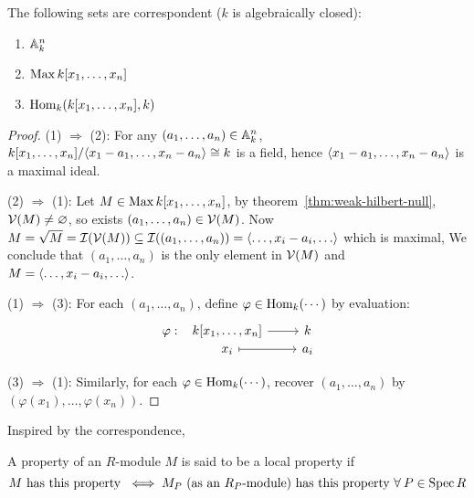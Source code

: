 \begin{prop}
  The following sets are correspondent ($k$ is algebraically closed):
  \begin{enumerate}[(1)]
    \item $\mathbb{A}_k^n$
    \item $\operatorname{Max} k[x_1, \dots, x_n]$
    \item $\operatorname{Hom}_k(k[x_1, \dots, x_n], k)$
  \end{enumerate}
  \begin{proof}
    (1) $\Rightarrow$ (2): For any $(a_1, \dots, a_n) \in \mathbb{A}_k^n$,
    $k[x_1, \dots, x_n] / \langle x_1 - a_1, \dots, x_n - a_n\rangle \cong k$ is a field,
    hence $\langle x_1 - a_1, \dots, x_n - a_n\rangle$ is a maximal ideal.

    (2) $\Rightarrow$ (1): Let $M \in \operatorname{Max} k[x_1, \dots, x_n]$,
    by theorem~\ref{thm:weak-hilbert-null}, $\mathcal{V}(M) \neq \varnothing$,
    so exists $(a_1, \dots, a_n) \in \mathcal{V}(M)$.
    Now $M = \sqrt{M} = \Ic(\Vc(M)) \subseteq \Ic((a_1, \dots, a_n)) = \gen{\dots, x_i - a_i, \dots}$
    which is maximal,
    We conclude that $(a_1, \dots, a_n)$ is the only element in $\mathcal{V}(M)$
    and $M = \gen{\dots, x_i - a_i, \dots}$.

    (1) $\Rightarrow$ (3): For each $(a_1, \dots, a_n)$, define $\varphi \in \operatorname{Hom}_k(\dotsm)$ by
    evaluation:
    \[
      \begin{tikzcd}[column sep=0.8cm,row sep=0ex]
        \varphi: &[-0.7cm] k[x_1, \dots, x_n] \arrow[r] & k \\
        & x_i \arrow[r, mapsto] & a_i
      \end{tikzcd}
    \]

    (3) $\Rightarrow$ (1): Similarly, for each $\varphi \in \operatorname{Hom}_k(\dotsm)$,
    recover $(a_1, \dots, a_n)$ by $(\varphi(x_1), \dots, \varphi(x_n))$.
  \end{proof}
\end{prop}

\begin{remark}
  Inspired by the correspondence,
\end{remark}

\begin{definition}
  A property of an $R$-module $M$ is said to be a local property if
  \[
    M \text{ has this property } \iff M_P
    \text{ (as an $R_P$-module) has this property } \forall P \in \Spec R
  \]
\end{definition}

